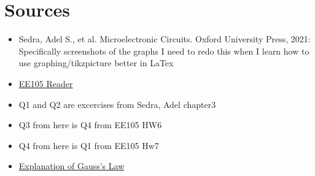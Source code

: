 

\section{Sources}
\begin{itemize}
    \item Sedra, Adel S., et al. Microelectronic Circuits. Oxford University Press, 2021: Specifically screenshots of the graphs I need to redo this when I learn how to use graphing/tikzpicture better in LaTex
    \item \href{https://file.notion.so/f/f/048d6522-202b-48d4-b5d9-bc005bd602e2/214bf1f0-292f-48d6-9016-737d9f5da155/ee105_reader_v3.pdf?id=237a4300-3dbe-47d1-888b-ffae90d8352b&table=block&spaceId=048d6522-202b-48d4-b5d9-bc005bd602e2&expirationTimestamp=1714435200000&signature=yx-H1qvZJIodPfazOpwXX0Ce2mWMG8skOHl45xoPxus&downloadName=ee105_reader_v3.pdf}{EE105 Reader}
    \item Q1 and Q2 are excercises from Sedra, Adel chapter3
    \item Q3 from here is Q4 from EE105 HW6
    \item Q4 from here is Q1 from EE105 Hw7
    \item \href{https://byjus.com/jee/gauss-law/}{Explanation of Gauss's Law}
\end{itemize}